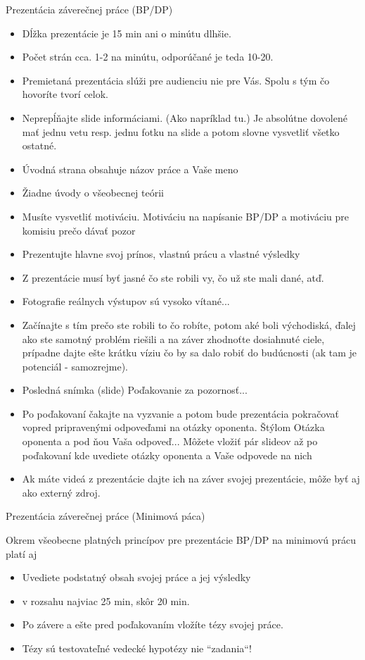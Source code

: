 \documentclass{beamer}
\begin{document}
\begin{frame}[allowframebreaks]{Prezentácia záverečnej práce (BP/DP)}
\begin{itemize}
  \item Dĺžka prezentácie je 15 min ani o minútu dlhšie.
  \item Počet strán cca. 1-2 na minútu, odporúčané je teda 10-20.
  \item Premietaná prezentácia slúži pre audienciu nie pre Vás. Spolu s tým čo hovoríte tvorí celok.
  \item Neprepĺňajte slide informáciami. (Ako napríklad tu.) Je absolútne dovolené mať jednu vetu resp. jednu fotku na slide a potom slovne vysvetliť všetko ostatné.
 \item Úvodná strana obsahuje názov práce a Vaše meno
 \item Žiadne úvody o všeobecnej teórii
 \item Musíte vysvetliť motiváciu. Motiváciu na napísanie BP/DP a motiváciu pre komisiu prečo dávať pozor
  \item Prezentujte hlavne svoj prínos, vlastnú prácu a vlastné výsledky
  \item Z prezentácie musí byť jasné čo ste robili vy, čo už ste mali dané, atď.
  \item Fotografie reálnych výstupov sú vysoko vítané...
  \item Začínajte s tím prečo ste robili to čo robíte, potom aké boli východiská, ďalej ako ste samotný problém riešili a na záver zhodnoťte dosiahnuté ciele, prípadne dajte ešte krátku víziu čo by sa dalo robiť do budúcnosti (ak tam je potenciál - samozrejme).
  \item Posledná snímka (slide) Poďakovanie za pozornosť...
 \item Po poďakovaní čakajte na vyzvanie a potom bude prezentácia pokračovať vopred pripravenými odpoveďami na otázky oponenta. Štýlom Otázka oponenta a pod ňou Vaša odpoveď... Môžete vložiť pár slideov až po poďakovaní kde uvediete otázky oponenta a Vaše odpovede na nich
 \item Ak máte videá z prezentácie dajte ich na záver svojej prezentácie, môže byť aj ako externý zdroj.

\end{itemize}
\end{frame}


\begin{frame}{Prezentácia záverečnej práce (Minimová páca)}

Okrem všeobecne platných princípov pre prezentácie BP/DP na minimovú prácu platí aj

\begin{itemize}
 \item Uvediete podstatný obsah svojej práce a jej výsledky
 \item v rozsahu najviac 25 min, skôr 20 min.
 \item Po závere a ešte pred poďakovaním vložíte tézy svojej práce.
 \item Tézy sú testovateľné vedecké hypotézy nie ``zadania``!
\end{itemize}
\end{frame}
\end{document}
